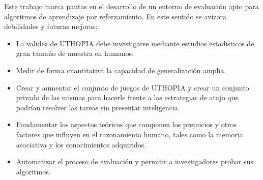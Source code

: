 \begin{recomendations}\label{recomendations}
    Este trabajo marca pautas en el desarrollo de un entorno de evaluación apto para algoritmos de aprendizaje por reforzamiento. En este sentido se avizora debilidades y futuras mejoras:
    
    \begin{itemize}
    \item La validez de UTHOPIA debe investigarse mediante estudios estadísticos de gran tamaño de muestra en humanos.
    \item Medir de forma cuantitativa la capacidad de generalización amplia.
    \item Crear y aumentar el conjunto de juegos de UTHOPIA y crear un conjunto privado de las mismas para hacerle frente a las estrategias de atajo que podrían resolver las tareas sin presentar inteligencia.
    \item Fundamentar los aspectos teóricos que componen los prejuicios y otros factores que influyen en el razonamiento humano, tales como la memoria asociativa y los conocimientos adquiridos.
    \item Automatizar el proceso de evaluación y permitir a investigadores probar sus algoritmos.
    \end{itemize}
    
\end{recomendations}
    
    